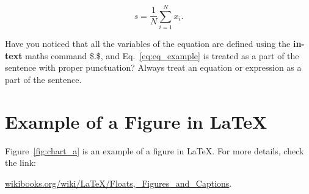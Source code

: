 \begin{equation}
  \label{eq:eq_example} %
  s = \frac{1}{N} \sum_{i = 1}^{N} x_i.
\end{equation}

Have you noticed that all the variables of the equation are defined
using the \textbf{in-text} maths command \$.\$, and
Eq.~\eqref{eq:eq_example} is treated as a part of the sentence with
proper punctuation? Always treat an equation or expression as a part
of the sentence.

\section{Example of a Figure in \LaTeX}
Figure~\ref{fig:chart_a} is an example of a figure in \LaTeX. For
more details, check the link:

\href{https://en.wikibooks.org/wiki/LaTeX/Floats,_Figures_and_Captions}{wikibooks.org/wiki/LaTeX/Floats,\_Figures\_and\_Captions}.

